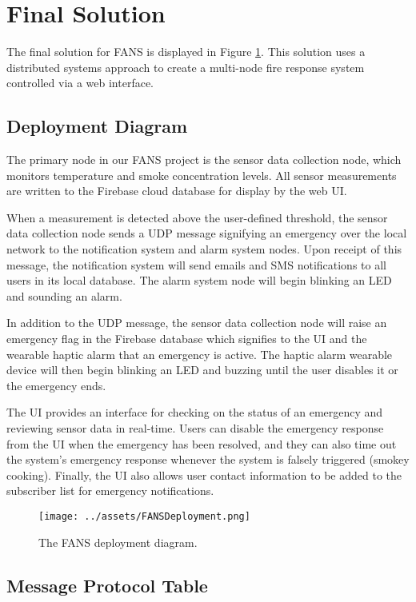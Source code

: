 \section{Final Solution}

The final solution for FANS is displayed in Figure \ref{fig:deployment}. This solution uses a distributed systems
approach to create a multi-node fire response system controlled via a web interface.

\subsection{Deployment Diagram}

The primary node in our FANS project is the sensor data collection node, which monitors temperature and smoke
concentration levels. All sensor measurements are written to the Firebase cloud database for display by the web UI.

When a measurement is detected above the user-defined threshold, the sensor data collection node sends a UDP message
signifying an emergency over the local network to the notification system and alarm system nodes. Upon receipt of this
message, the notification system will send emails and SMS notifications to all users in its local database. The alarm
system node will begin blinking an LED and sounding an alarm.

In addition to the UDP message, the sensor data collection node will raise an emergency flag in the Firebase database
which signifies to the UI and the wearable haptic alarm that an emergency is active. The haptic alarm wearable device
will then begin blinking an LED and buzzing until the user disables it or the emergency ends.

The UI provides an interface for checking on the status of an emergency and reviewing sensor data in real-time. Users
can disable the emergency response from the UI when the emergency has been resolved, and they can also time out the
system’s emergency response whenever the system is falsely triggered (smokey cooking). Finally, the UI
also allows user contact information to be added to the subscriber list for emergency notifications.

\begin{figure}
    \centering
    \texttt{[image: ../assets/FANSDeployment.png]}
    \caption{The FANS deployment diagram.}
    \label{fig:deployment}
\end{figure}

\subsection{Message Protocol Table}

